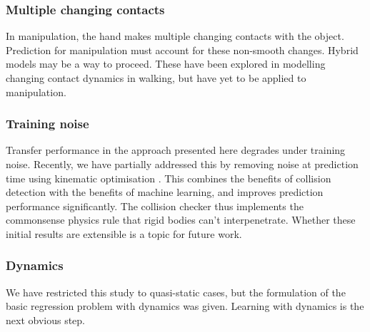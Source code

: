 \subsubsection{Multiple changing contacts}  In manipulation, the hand makes multiple changing contacts with the object. Prediction for manipulation must account for these non-smooth changes. Hybrid models may be a way to proceed. These have been explored in modelling changing contact dynamics in walking, but have yet to be applied to manipulation.

\subsubsection{ Training noise} Transfer performance in the approach presented here degrades under training noise. Recently, we have partially addressed this by removing noise at prediction time using kinematic optimisation \citep{belter2014iros}. This combines the benefits of collision detection with the benefits of machine learning, and improves prediction performance significantly. The collision checker thus implements the commonsense physics rule that rigid bodies can't interpenetrate. Whether these initial results are extensible is a topic for future work.

\subsubsection{Dynamics} We have restricted this study to quasi-static cases, but the formulation of the basic regression problem with dynamics was given. Learning with dynamics is the next obvious step. 


